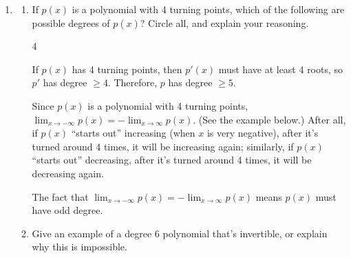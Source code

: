 \documentclass{article}
\theoremstyle{theorem}
\begin{document}
\begin{enumerate}
\begin{enumerate}
  \end{enumerate}

\item {} 

  \begin{enumerate}
  \item
    \begin{problem}[\nstretch{0.5}]
      If $p(x)$ is a polynomial with 4 turning points, which of the following are possible degrees of $p(x)$? Circle all, and explain your reasoning. 

      \begin{multicols}{4}
        \begin{enumerate}[label=\maybecircle{\Alph*.}]
        \end{enumerate}        
      \end{multicols}
    \end{problem}

    \begin{solution}      
      If $p(x)$ has 4 turning points, then $p'(x)$ must have at least 4 roots, so $p'$ has degree $\geq 4$. Therefore, $p$ has degree $\geq 5$. 

      Since $p(x)$ is a polynomial with 4 turning points, $\displaystyle \lim_{x \to -\infty} p(x) = - \lim_{x \to \infty} p(x)$. (See the example below.) After all, if $p(x)$ ``starts out'' increasing (when $x$ is very negative), after it's turned around 4 times, it will be increasing again; similarly, if $p(x)$ ``starts out'' decreasing, after it's turned around 4 times, it will be decreasing again.

      The fact that $\displaystyle \lim_{x \to -\infty} p(x) = - \lim_{x \to \infty} p(x)$ means $p(x)$ must have odd degree. 
      \begin{center}
      \end{center}
    \end{solution}

  \item
    \begin{problem}[\vfill]
      Give an example of a degree 6 polynomial that's invertible, or explain why this is impossible. 
    \end{problem}


\end{enumerate}
\end{enumerate}
\end{document}

